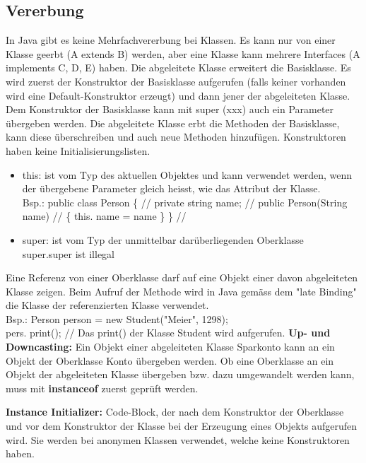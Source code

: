 \subsection{Vererbung}
In Java gibt es keine Mehrfachvererbung bei Klassen. Es kann nur von einer Klasse geerbt (A extends B) werden, aber eine Klasse kann mehrere Interfaces (A implements C, D, E) haben. Die abgeleitete Klasse erweitert die Basisklasse. Es wird zuerst der Konstruktor der Basisklasse aufgerufen (falls keiner vorhanden wird eine Default-Konstruktor erzeugt) und dann jener der abgeleiteten Klasse. Dem Konstruktor der Basisklasse kann mit super (xxx) auch ein Parameter übergeben werden. Die abgeleitete Klasse erbt die Methoden der Basisklasse, kann diese überschreiben und auch neue Methoden hinzufügen. Konstruktoren haben keine Initialisierungslisten. 
\begin{itemize}
	\item this: ist vom Typ des aktuellen Objektes und kann verwendet werden, wenn der übergebene Parameter gleich heisst, wie das Attribut der Klasse.  \\
	Bsp.: public class Person \{ //
	private string name; //
	public Person(String name) //
	\{	this. name = name \} \} //
	\item super: ist vom Typ der unmittelbar darüberliegenden Oberklasse	\\
	super.super ist illegal
\end{itemize}  
Eine Referenz von einer Oberklasse darf auf eine Objekt einer davon abgeleiteten Klasse zeigen. Beim Aufruf der Methode wird in Java gemäss dem "late Binding" die Klasse der referenzierten Klasse verwendet. \\
Bsp.: Person person = new Student("Meier", 1298); \\
pers. print();  // Das print() der Klasse Student wird aufgerufen.
\newline
\newline
\textbf{Up- und Downcasting: } Ein Objekt einer abgeleiteten Klasse Sparkonto kann an ein Objekt der Oberklasse Konto übergeben werden. Ob eine Oberklasse an ein Objekt der abgeleiteten Klasse übergeben bzw. dazu umgewandelt werden kann, muss mit \textbf{instanceof} zuerst geprüft werden. 

 
\textbf{Instance Initializer: } Code-Block, der nach dem Konstruktor der Oberklasse und vor dem Konstruktor der Klasse bei der Erzeugung eines Objekts aufgerufen wird. Sie werden bei anonymen Klassen verwendet, welche keine Konstruktoren haben.  

